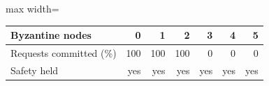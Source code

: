 \begin{adjustbox}{max width=\linewidth}
\begin{tabular}{lrrrrrr}
\toprule
Byzantine nodes & 0 & 1 & 2 & 3 & 4 & 5 \\
\midrule
Requests committed (\%) & 100 & 100 & 100 & 0 & 0 & 0 \\
Safety held & yes & yes & yes & yes & yes & yes \\
\bottomrule
\end{tabular}
\end{adjustbox}
\par{}
